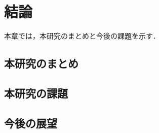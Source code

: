 \chapter{結論}
\label{conclusion}

本章では，本研究のまとめと今後の課題を示す．

\section{本研究のまとめ}

\section{本研究の課題}

\section{今後の展望}

